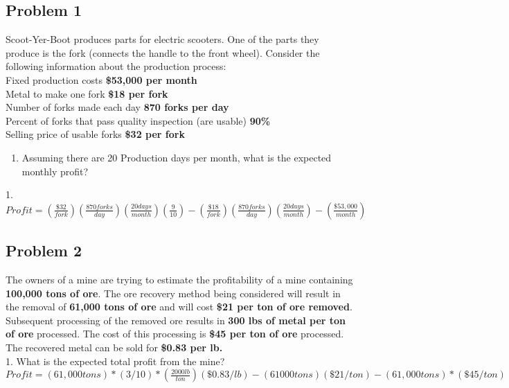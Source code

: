 \documentclass[11pt]{article}
\begin{document}
\subsection{Problem 1}
Scoot-Yer-Boot produces parts for electric scooters.  One of the parts they produce is the fork (connects the handle to the front wheel).  Consider the following information about the production process:
\\
Fixed production costs 	   \textbf{\$53,000 per month}
\\
Metal to make one fork 	   \textbf{\$18 per fork}
\\
Number of forks made each day 	   \textbf{870 forks per day}
\\
Percent of forks that pass quality inspection (are usable) 		\textbf{90\%}
\\
Selling price of usable forks 	  \textbf{\$32 per fork}
\begin{enumerate}
	\item Assuming there are 20 Production days per month, what is the expected monthly profit?
\end{enumerate}
1. 
\\
$ Profit = (\frac{\$32}{fork})(\frac{870 forks}{day})(\frac{20 days}{month})(\frac{9}{10}) - (\frac{\$18}{fork})(\frac{870 forks}{day})(\frac{20 days}{month}) - (\frac{\$53,000}{month})$
\\
\subsection{Problem 2}
The owners of a mine are trying to estimate the profitability of a mine containing \textbf{100,000 tons of ore}. The ore recovery method being considered will result in the removal of \textbf{61,000 tons of ore} and will cost \textbf{\$21 per ton of ore removed}. Subsequent processing of the removed ore results in \textbf{300 lbs of metal per ton of ore} processed. The cost of this processing is \textbf{\$45 per ton of ore} processed. The recovered metal can be sold for \textbf{\$0.83 per lb.}
\\
1. 
What is the expected total profit from the mine?
\\
$ Profit = (61,000 tons)*(3/10)*(\frac{2000 lb}{ton})(\$0.83/lb) - (61000 tons)(\$21/ton) - (61,000 tons)*(\$45/ton)$
\end{document}
